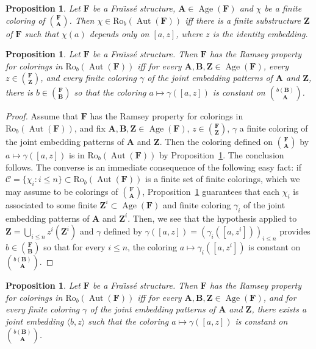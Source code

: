\documentclass[11pt]{article}
\newtheorem{prop}[theo]{Proposition}
\theoremstyle{definition}
\numberwithin{equation}{section}
\numberwithin{figure}{section}
\numberwithin{table}{section}
\newcommand*{\mA}{\mathbf{A}}
\newcommand*{\mB}{\mathbf{B}}
\newcommand*{\mF}{\mathbf{F}}
\newcommand*{\mZ}{\mathbf{Z}}
\DeclareMathOperator{\Aut}{Aut}
\DeclareMathOperator{\Age}{Age}
\newcommand{\ROB}{\mathrm{Ro}_{b}}
\begin{document}
\begin{prop}\label{prop:Roelcke coloring}
Let $\mF$ be a Fra\"{\i}ss\'e structure, $\mA\in \Age(\mF)$ and $\chi$ be a finite coloring of $\binom{\mF}{\mA}$. Then $\chi\in \ROB(\Aut(\mF))$ iff there is a finite substructure $\mZ$ of $\mF$ such that $\chi(a)$ depends only on $[a,z]$, where $z$ is the identity embedding.
\end{prop}

\begin{prop}\label{prop:RoelckeRP}
Let $\mF$ be a Fra\"{\i}ss\'e structure. Then $\mF$ has the Ramsey property for colorings in $\ROB(\Aut(\mF))$ iff for every $\mA, \mB, \mZ\in \Age(\mF)$, every $z\in \binom{\mF}{\mZ}$, and every finite coloring $\gamma$ of the joint embedding patterns of $\mA$ and $\mZ$, there is $b\in \binom{\mF}{\mB}$ so that the coloring $a\mapsto \gamma([a,z])$ is constant on $\binom{b(\mB)}{\mA}$.
\end{prop}

\begin{proof}
Assume that $\mF$ has the Ramsey property for colorings in $\ROB(\Aut(\mF))$, and fix $\mA, \mB, \mZ\in \Age(\mF)$, $z\in \binom{\mF}{\mZ}$, $\gamma$ a finite coloring of the joint embedding patterns of $\mA$ and $\mZ$. Then the coloring defined on $\binom{\mF}{\mA}$ by $a\mapsto \gamma([a,z])$ is in $\ROB(\Aut(\mF))$ by Proposition~\ref{prop:Roelcke coloring}. The conclusion follows. The converse is an immediate consequence of the following easy fact: if $\mathcal C = \{ \chi_{i}:i\leq n\} \subset \ROB(\Aut(\mF))$ is a finite set of finite colorings, which we may assume to be colorings of $\binom{\mF}{\mA}$, Proposition~\ref{prop:Roelcke coloring} guarantees that each $\chi_{i}$ is associated to some finite $\mZ^{i}\subset \Age(\mF)$ and finite coloring $\gamma_{i}$ of the joint embedding patterns of $\mA$ and $\mZ^{i}$. Then, we see that the hypothesis applied to $\mZ=\bigcup_{i\leq n}z^{i}(\mZ^{i})$ and $\gamma$ defined by $\gamma([a,z]) = (\gamma_{i}([a,z^{i}]))_{i\leq n}$ provides $b\in \binom{\mF}{\mB}$ so that for every $i\leq n$, the coloring $a\mapsto \gamma_{i}([a,z^{i}])$ is constant on $\binom{b(\mB)}{\mA}$.
\end{proof}

\begin{prop}\label{prop:RPRoelcke}
Let $\mF$ be a Fra\"{\i}ss\'e structure. Then $\mF$ has the Ramsey property for colorings in $\ROB(\Aut(\mF))$ iff for every $\mA, \mB, \mZ\in \Age(\mF)$, and for every finite coloring $\gamma$ of the joint embedding patterns of $\mA$ and $\mZ$, there exists a joint embedding $\langle b,z\rangle$ such that the coloring $a\mapsto \gamma([a,z])$ is constant on $\binom{b(\mB)}{\mA}$.
\end{prop}
\end{document}
